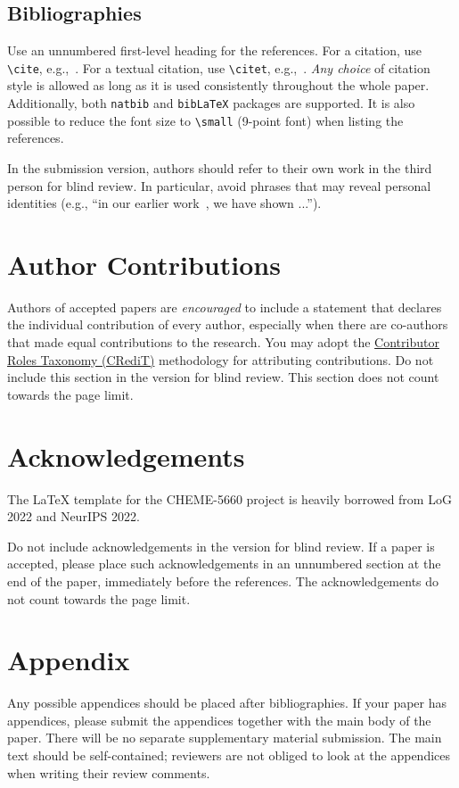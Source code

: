 \documentclass{article}
\begin{document}
\subsection{Bibliographies}
Use an unnumbered first-level heading for the references.
For a citation, use \verb+\cite+, e.g.,~\cite{Kipf:2017tc}.
For a textual citation, use \verb+\citet+, e.g.,~\citet{Velickovic:2018we}.
\emph{Any choice} of citation style is allowed as long as it is used consistently throughout the whole paper.
Additionally, both \verb+natbib+ and \verb+bibLaTeX+ packages are supported.
It is also possible to reduce the font size to \verb+\small+ (9-point font) when listing the references.

In the submission version, authors should refer to their own work in the third person for blind review.
In particular, avoid phrases that may reveal personal identities (e.g., ``in our earlier work~\cite{Hamilton:2017tp}, we have shown ...'').

\section*{Author Contributions}
Authors of accepted papers are \emph{encouraged} to include a statement that declares the individual contribution of every author, especially when there are co-authors that made equal contributions to the research.
You may adopt the \href{https://credit.niso.org/}{Contributor Roles Taxonomy (CRediT)} methodology for attributing contributions.
Do not include this section in the version for blind review.
This section does not count towards the page limit.

\section*{Acknowledgements}
The \LaTeX{} template for the CHEME-5660 project is heavily borrowed from LoG 2022 and NeurIPS 2022.

Do not include acknowledgements in the version for blind review.
If a paper is accepted, please place such acknowledgements in an unnumbered section at the end of the paper, immediately before the references.
The acknowledgements do not count towards the page limit.




\appendix
\section{Appendix}
Any possible appendices should be placed after bibliographies.
If your paper has appendices, please submit the appendices together with the main body of the paper.
There will be no separate supplementary material submission.
The main text should be self-contained; reviewers are not obliged to look at the appendices when writing their review comments.
\end{document}
